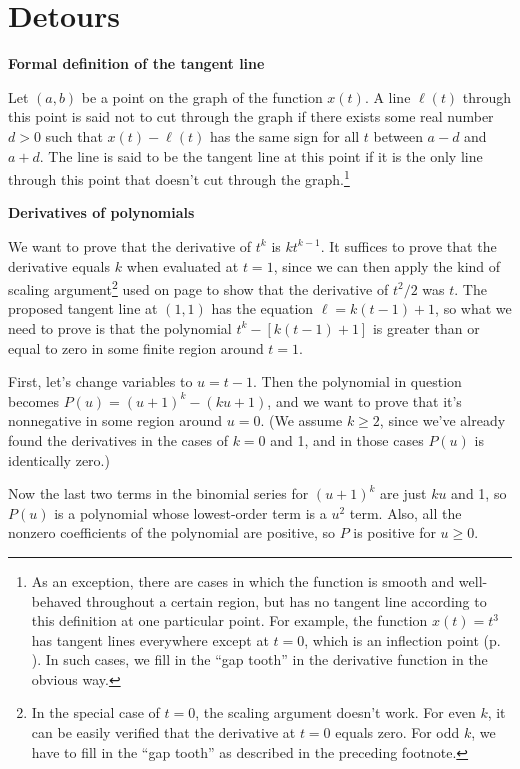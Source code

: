 \chapter{Detours}

\newcommand{\detour}[2]{\textbf{#2}\label{detour:#1}}

\detour{def-tangent}{Formal definition of the tangent line}

Let $(a,b)$ be a point on the graph of the function $x(t)$.
A line $\ell(t)$ through this point is said not to cut through the graph
if there exists some real number $d>0$ such that
$x(t)-\ell(t)$ has the same sign for all $t$ between $a-d$ and $a+d$.
The line is said to be the tangent line at this point if it is the
only line through this point that doesn't cut through the graph.\footnote{As an exception,
there are cases in which the function is smooth and well-behaved throughout a certain
region, but has no tangent line according to this definition at one particular point.
For example, the function $x(t)=t^3$ has tangent lines everywhere except at $t=0$,
which is an inflection point (p. \pageref{inflection}). In such cases, we fill in the
``gap tooth'' in the derivative function in the obvious way.}

\detour{polynomial-proof}{Derivatives of polynomials}

We want to prove that the derivative of $t^k$ is $kt^{k-1}$. It suffices to
prove that the derivative equals $k$ when evaluated at $t=1$, since we can
then apply the kind of scaling argument\footnote{In the special case of $t=0$,
the scaling argument doesn't work. For even $k$, it can be easily verified that
the derivative at $t=0$ equals zero. For odd $k$, we have to fill in the ``gap tooth''
as described in the preceding footnote.} used on page \pageref{scaling} to
show that the derivative of $t^2/2$ was $t$. The proposed tangent line at $(1,1)$
has the equation $\ell=k(t-1)+1$, so what we need to prove is that
the polynomial $t^k-[k(t-1)+1]$ is greater than or equal to zero in some
finite region around $t=1$.

First, let's change variables to $u=t-1$. Then the polynomial in question becomes
$P(u)=(u+1)^k-(ku+1)$, and we want to prove that it's nonnegative in some region
around $u=0$. (We assume $k\ge 2$, since we've already found the derivatives in the
cases of $k=0$ and 1, and in those cases $P(u)$ is identically zero.)

Now the last two terms in the binomial series for $(u+1)^k$ are just $ku$ and 1,
so $P(u)$ is a polynomial whose lowest-order term is a $u^2$ term. Also, all the
nonzero coefficients of the polynomial are positive, so $P$ is positive for
$u\ge 0$.

